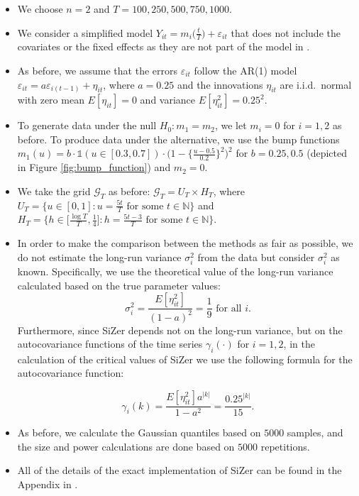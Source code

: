 \documentclass[a4paper,12pt]{article}
\begin{document}
\begin{itemize}[label=--,leftmargin=0.45cm,itemsep=0pt]

\item We choose $n=2$ and $T=100,250,500, 750, 1000$.

\item We consider a simplified model $Y_{it} = m_i\big(\frac{t}{T}\big) + \varepsilon_{it}$ that does not include the covariates or the fixed effects as they are not part of the model in \cite{Park2009}.
\item As before, we assume that the errors $\varepsilon_{it}$ follow the AR(1) model $\varepsilon_{it} = a \varepsilon_{i(t-1)} + \eta_{it}$, where $a=0.25$ and the innovations $\eta_{it}$ are i.i.d.\ normal with zero mean $E[\eta_{it}]=0$ and variance $E[\eta_{it}^2]=0.25^2$. 

\item To generate data under the null $H_0: m_1 = m_2$, we let $m_i = 0$ for $i=1, 2$ as before. To produce data under the alternative, we use the bump functions $m_1(u) = b \cdot \mathbb{1}(u \in [0.3, 0.7]) \cdot \big(1 - \big\{\frac{u - 0.5}{0.2}\big\}^2\big)^2$ for $b = 0.25, 0.5$ (depicted in Figure \ref{fig:bump_function}) and $m_2 = 0$.

\item We take the grid $\mathcal{G}_T$ as before: $\mathcal{G}_T = U_T \times H_T$, where $U_T = \big\{ u \in [0,1]: u = \textstyle{\frac{5t}{T}} \text{ for some } t \in \mathbb{N} \big\}$ and $H_T = \big\{ h \in \big[ \textstyle{\frac{\log T}{T}}, \textstyle{\frac{1}{4}} \big]:  h = \textstyle{\frac{5t - 3}{T}} \text{ for some } t \in \mathbb{N} \big\}$.

\item In order to make the comparison between the methods as fair as possible, we do not estimate the long-run variance $\sigma_i^2$ from the data but consider $\sigma_i^2$ as known. Specifically, we use the theoretical value of the long-run variance calculated based on the true parameter values: $$\sigma_i^2 = \frac{E[\eta_{it}^2]}{(1 - a)^2} = \frac{1}{9} \text{ for all }i.$$ Furthermore, since SiZer depends not on the long-run variance, but on the autocovariance functions of the time series $\gamma_i(\cdot)$ for $i=1, 2$, in the calculation of the critical values of SiZer we use the following formula for the autocovariance function:

$$\gamma_{i}(k) = \frac{E[\eta_{it}^2] a^{|k|}}{1 - a^2} = \frac{0.25^{|k|}}{15}.$$

\item As before, we calculate the Gaussian quantiles based on $5000$ samples, and the size and power calculations are done based on $5000$ repetitions.
\item All of the details of the exact implementation of SiZer can be found in the Appendix in \cite{KhismatullinaVogt2020}.

\end{itemize}
\end{document}
